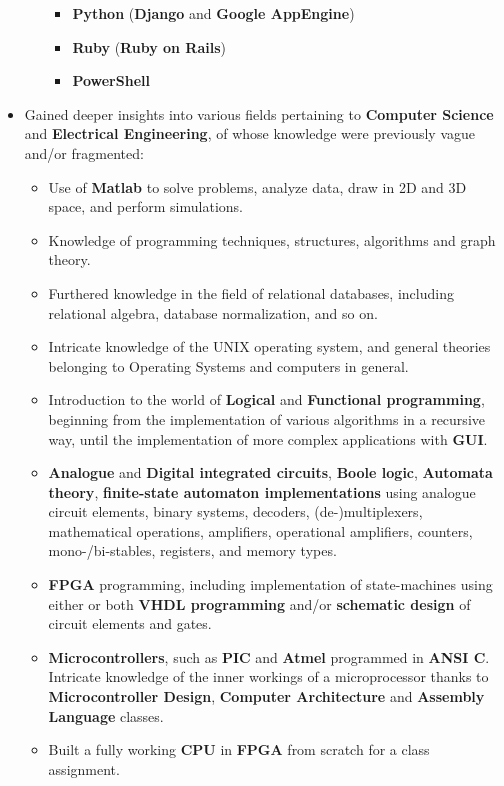 \documentclass[11pt,a4paper]{article}
\begin{document}
\begin{itemize}
\begin{itemize}
\begin{itemize}
			\item	\textbf{Python} (\textbf{Django} and \textbf{Google AppEngine})
			\item	\textbf{Ruby} (\textbf{Ruby on Rails})
			\item	\textbf{PowerShell}
			\end{itemize}
		\end{itemize}
	\item	Gained deeper insights into various fields pertaining to \textbf{Computer Science} and \textbf{Electrical Engineering}, of whose knowledge were previously vague and/or fragmented:
		\begin{itemize}
		\item	Use of \textbf{Matlab} to solve problems, analyze data, draw in 2D and 3D space, and perform simulations.
		\item	Knowledge of programming techniques, structures, algorithms and graph theory.
		\item	Furthered knowledge in the field of relational databases, including relational algebra, database normalization, and so on.
		\item	Intricate knowledge of the UNIX operating system, and general theories belonging to Operating Systems and computers in general.
		\item	Introduction to the world of \textbf{Logical} and \textbf{Functional programming}, beginning from the implementation of various algorithms in a recursive way, until the implementation of more complex applications with \textbf{GUI}.
		\item	\textbf{Analogue} and \textbf{Digital integrated circuits}, \textbf{Boole logic}, \textbf{Automata theory}, \textbf{finite-state automaton implementations} using analogue circuit elements, binary systems, decoders, (de-)multiplexers, mathematical operations, amplifiers, operational amplifiers, counters, mono-/bi-stables, registers, and memory types.
		\item	\textbf{FPGA} programming, including implementation of state-machines using either or both \textbf{VHDL programming} and/or \textbf{schematic design} of circuit elements and gates.
		\item	\textbf{Microcontrollers}, such as \textbf{PIC} and \textbf{Atmel} programmed in \textbf{ANSI C}. Intricate knowledge of the inner workings of a microprocessor thanks to \textbf{Microcontroller Design}, \textbf{Computer Architecture} and \textbf{Assembly Language} classes.
		\item	Built a fully working \textbf{CPU} in \textbf{FPGA} from scratch for a class assignment.

\end{itemize}
\end{itemize}
\end{document}
